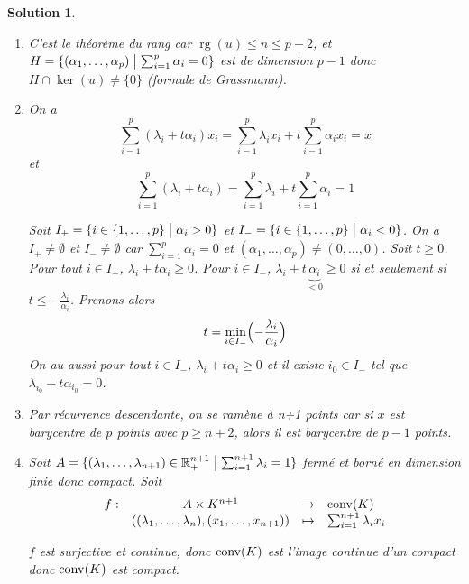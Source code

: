 \documentclass[12pt]{article}
\newtheorem{solution}{Solution}[section]
\theoremstyle{remark}
\DeclareMathOperator{\rg}{rg} \DeclareMathOperator{\Tr}{Tr}
\newcommand{\function}[5]{
	$$
	\begin{array}{rccl}
		#1: & #2 & \to & #3 \\
		& #4 & \mapsto & #5
	\end{array}
	$$
}
\begin{document}
\begin{solution}
	\phantom{}
	\begin{enumerate}
		\item C'est le théorème du rang car $\rg(u)\leqslant n\leqslant p-2$, et $H=\{(\alpha_{1},\dots,\alpha_{p})\bigm|\sum_{i=1}^{p}\alpha_{i}=0\}$ est de dimension $p-1$ donc $H\cap\ker(u)\neq\{0\}$ (formule de Grassmann).
		
		\item On a 
		$$\sum_{i=1}^{p}(\lambda_{i}+t\alpha_{i})x_{i}=\sum_{i=1}^{p}\lambda_{i}x_{i}+t\sum_{i=1}^{p}\alpha_{i}x_{i}=x$$
		et
		$$\sum_{i=1}^{p}(\lambda_{i}+t\alpha_{i})=\sum_{i=1}^{p}\lambda_{i}+t\sum_{i=1}^{p}\alpha_{i}=1$$

		Soit $I_{+}=\{i\in\{1,\dots,p\}\bigm|\alpha_{i}>0\}$ et $I_{-}=\{i\in\{1,\dots,p\}\bigm|\alpha_{i}<0\}$. On a $I_{+}\neq\emptyset$ et $I_{-}\neq\emptyset$ car $\sum_{i=1}^{p}\alpha_{i}=0$ et $(\alpha_{1},\dots,\alpha_{p})\neq(0,\dots,0)$. Soit $t\geqslant0$. Pour tout $i\in I_{+}$, $\lambda_{i}+t\alpha_{i}\geqslant0$. Pour $i\in I_{-}$, $\lambda_{i}+t\underbrace{\alpha_{i}}_{<0}\geqslant 0$ si et seulement si $t\leqslant-\frac{\lambda_{i}}{\alpha_{i}}$. Prenons alors 
		$$t=\min\limits_{i\in I_{-}}\Bigl(-\frac{\lambda_{i}}{\alpha_{i}}\Bigr)$$
		On au aussi pour tout $i\in I_{-}$, $\lambda_{i}+t\alpha_{i}\geqslant 0$ et il existe $i_{0}\in I_{-}$ tel que $\lambda_{i_{0}}+t\alpha_{i_{0}}=0$.

		\item Par récurrence descendante, on se ramène à n+1 points car si $x$ est barycentre de $p$ points avec $p\geqslant n+2$, alors il est barycentre de $p-1$ points.
		
		\item Soit $A=\{(\lambda_{1},\dots,\lambda_{n+1})\in\mathbb{R}_{+}^{n+1}\bigm|\sum_{i=1}^{n+1}\lambda_{i}=1\}$ fermé et borné en dimension finie donc compact. Soit \function{f}{A\times K^{n+1}}{\conv(K)}{((\lambda_{1},\dots,\lambda_{n}),(x_{1},\dots,x_{n+1}))}{\sum_{i=1}^{n+1}\lambda_{i}x_{i}}
		$f$ est surjective et continue, donc $\operatorname{conv}(K)$ est l'image continue d'un compact donc $\operatorname{conv}(K)$ est compact.
	\end{enumerate}
\end{solution}
\end{document}
